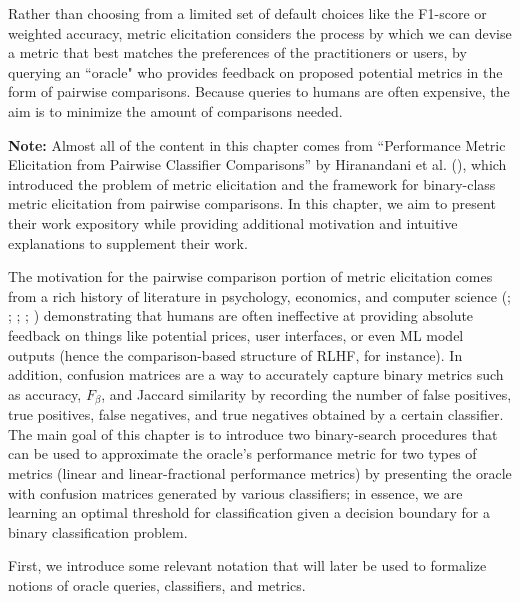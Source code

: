 \documentclass[
  letterpaper,
  DIV=11,
  numbers=noendperiod,
  oneside]{scrreprt}
\theoremstyle{remark}
\begin{document}
Rather than choosing from a limited set of default choices like the
F1-score or weighted accuracy, metric elicitation considers the process
by which we can devise a metric that best matches the preferences of the
practitioners or users, by querying an ``oracle" who provides feedback
on proposed potential metrics in the form of pairwise comparisons.
Because queries to humans are often expensive, the aim is to minimize
the amount of comparisons needed.

\textbf{Note:} Almost all of the content in this chapter comes from
``Performance Metric Elicitation from Pairwise Classifier Comparisons''
by Hiranandani et al.
(),
which introduced the problem of metric elicitation and the framework for
binary-class metric elicitation from pairwise comparisons. In this
chapter, we aim to present their work expository while providing
additional motivation and intuitive explanations to supplement their
work.

The motivation for the pairwise comparison portion of metric elicitation
comes from a rich history of literature in psychology, economics, and
computer science (;
; ; ;
) demonstrating that
humans are often ineffective at providing absolute feedback on things
like potential prices, user interfaces, or even ML model outputs (hence
the comparison-based structure of RLHF, for instance). In addition,
confusion matrices are a way to accurately capture binary metrics such
as accuracy, \(F_\beta\), and Jaccard similarity by recording the number
of false positives, true positives, false negatives, and true negatives
obtained by a certain classifier. The main goal of this chapter is to
introduce two binary-search procedures that can be used to approximate
the oracle's performance metric for two types of metrics (linear and
linear-fractional performance metrics) by presenting the oracle with
confusion matrices generated by various classifiers; in essence, we are
learning an optimal threshold for classification given a decision
boundary for a binary classification problem.

First, we introduce some relevant notation that will later be used to
formalize notions of oracle queries, classifiers, and metrics.
\end{document}
